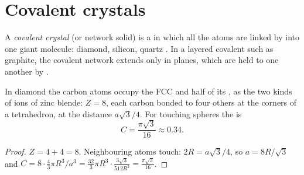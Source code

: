 \section{Covalent crystals}

\begin{definition}\label{def:b1:crystals-ionic-covalent:covalent-crystal}
A \emph{covalent crystal} (or network solid) is a
 in which all the atoms are linked by  into one
giant molecule: diamond, silicon, quartz . In a layered
covalent  such as graphite, the covalent network extends only in
planes, which are held to one another by .
\end{definition}

\begin{proposition}\label{prop:b1:crystals-ionic-covalent:diamond}
In diamond the carbon atoms occupy the FCC  and half of its
, as the two kinds of ions of zinc blende: $Z = 8$, each
carbon bonded to four others at the corners of a tetrahedron, at the
distance $a\sqrt3/4$. For touching spheres the  is
\[
  C = \frac{\pi\sqrt3}{16} \approx 0.34 .
\]
\end{proposition}

\begin{proof}
$Z = 4 + 4 = 8$. Neighbouring atoms touch: $2R = a\sqrt3/4$, so $a =
8R/\sqrt3$ and $C = 8 \cdot \frac43\pi R^3/a^3 = \frac{32}{3}\pi R^3 \cdot
\frac{3\sqrt3}{512 R^3} = \frac{\pi\sqrt3}{16}$.
\end{proof}

